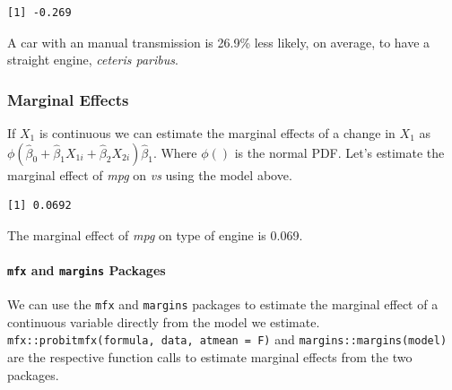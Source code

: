 \documentclass[]{book}
\newenvironment{Shaded}{\begin{snugshade}}{\end{snugshade}}
\newcommand{\DecValTok}[1]{\textcolor[rgb]{0.00,0.00,0.81}{#1}}
\newcommand{\KeywordTok}[1]{\textcolor[rgb]{0.13,0.29,0.53}{\textbf{#1}}}
\newcommand{\NormalTok}[1]{#1}
\newcommand{\OperatorTok}[1]{\textcolor[rgb]{0.81,0.36,0.00}{\textbf{#1}}}
\newcommand{\StringTok}[1]{\textcolor[rgb]{0.31,0.60,0.02}{#1}}
\let\oldparagraph\paragraph
\renewcommand{\paragraph}[1]{\oldparagraph{#1}\mbox{}}
\begin{document}
\begin{verbatim}
[1] -0.269
\end{verbatim}

A car with an manual transmission is 26.9\% less likely, on average, to have a straight engine, \emph{ceteris paribus}.

\hypertarget{marginal-effects}{%
\subsubsection{Marginal Effects}\label{marginal-effects}}

If \(X_1\) is continuous we can estimate the marginal effects of a change in \(X_1\) as \(\phi(\hat\beta_0+\hat\beta_1X_{1i}+\hat\beta_2X_{2i})\hat\beta_1\). Where \(\phi()\) is the normal PDF. Let's estimate the marginal effect of \emph{mpg} on \emph{vs} using the model above.

\begin{Shaded}
\end{Shaded}

\begin{verbatim}
[1] 0.0692
\end{verbatim}

The marginal effect of \emph{mpg} on type of engine is 0.069.

\hypertarget{mfx-and-margins-packages}{%
\paragraph{\texorpdfstring{\texttt{mfx} and \texttt{margins} Packages}{mfx and margins Packages}}\label{mfx-and-margins-packages}}

We can use the \texttt{mfx} and \texttt{margins} packages to estimate the marginal effect of a continuous variable directly from the model we estimate. \texttt{mfx::probitmfx(formula,\ data,\ atmean\ =\ F)} and \texttt{margins::margins(model)} are the respective function calls to estimate marginal effects from the two packages.
\end{document}
